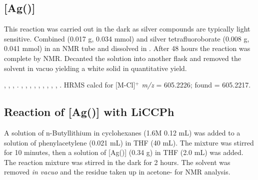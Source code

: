 
\subsection*{\texorpdfstring{[Ag(\tBuxantphos)]} A} %


This reaction was carried out in the dark as silver compounds are typically light sensitive.  Combined \tBuxantphos{} (0.017 g, 0.034 mmol) and silver tetrafluoroborate (0.008 g, 0.041 mmol) in an NMR tube and dissolved in .  After 48 hours the reaction was complete by NMR.  Decanted the solution into another flask and removed the solvent in vacuo yielding a white solid in quantitative yield.  

,
,
,
.
,
,
,
,
,
,
,
,
,
.
HRMS calcd for  [M-Cl]$^+$ \emph{m/z} = 605.2226; found = 605.2217.

\subsection*{Reaction of \texorpdfstring{[Ag(\tBusixantphos)]} A with LiCCPh}

A solution of n-Butyllithium in cyclohexanes (1.6M 0.12 mL) was added to a solution of phenylacetylene (0.021 mL) in THF (40 mL).  The mixture was stirred for 10 minutes, then a solution of [Ag(\tBusixantphos)] (0.34 g) in THF (2.0 mL) was added.  The reaction mixture was stirred in the dark for 2 hours.  The solvent was removed \emph{in vacuo} and the residue taken up in acetone- for NMR analysis.   

